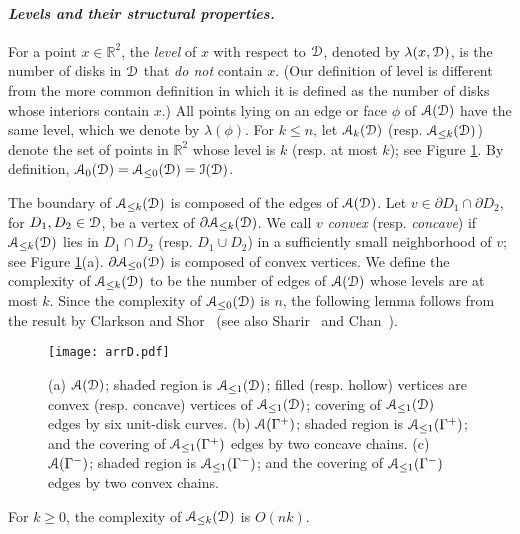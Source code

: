 \documentclass[11pt]{myclass}
\renewcommand{\b}[1]{\ensuremath{\mathbb{#1}}}
\newcommand{\EuD}{\ensuremath{\EuScript{D}}}
\newcommand{\EuA}{\ensuremath{\EuScript{A}}}
\newcommand{\EuI}{\ensuremath{\EuScript{I}}}
\begin{document}
\paragraph{\textbf{\emph{Levels and their structural properties.}}}
For a point $x \in \b{R}^2$, the \emph{level} of $x$ with respect to $\EuD$, denoted by $\lambda(x,\EuD)$, is the number of disks in $\EuD$ that \emph{do not} contain $x$.  (Our definition of level is different from the more common definition in which it is defined as the number of disks whose interiors contain $x$.)  All points lying on an edge or face $\phi$ of $\EuA(\EuD)$ have the same level, which we denote by $\lambda(\phi)$.  For $k \leq n$, let $\EuA_k(\EuD)$ (resp. $\EuA_{\leq k}(\EuD)$) denote the set of points in $\b{R}^2$ whose level is $k$ (resp. at most $k$); see Figure \ref{fig:arrD}.  By definition, $\EuA_0(\EuD) = \EuA_{\leq 0}(\EuD) = \EuI(\EuD)$.  

The boundary of $\EuA_{\leq k}(\EuD)$ is composed of the edges of $\EuA(\EuD)$.  
Let $v \in \partial D_1 \cap \partial D_2$, for $D_1, D_2 \in \EuD$, be a vertex of $\partial \EuA_{\leq k}(\EuD)$.  We call $v$ \emph{convex} (resp. \emph{concave}) if $\EuA_{\leq k}(\EuD)$ lies in $D_1 \cap D_2$ (resp. $D_1 \cup D_2$) in a sufficiently small neighborhood of $v$; see Figure \ref{fig:arrD}(a).  $\partial \EuA_{\leq 0}(\EuD)$ is composed of convex vertices.
We define the complexity of $\EuA_{\leq k}(\EuD)$ to be the number of edges of $\EuA(\EuD)$ whose levels are at most $k$.  Since the complexity of $\EuA_{\leq 0}(\EuD)$ is $n$, the following lemma follows from the result by Clarkson and Shor~\cite{CS89} (see also Sharir~\cite{Sha91} and Chan~\cite{Cha07}).  

\begin{figure}
  \centering
  \texttt{[image: arrD.pdf]}
\caption{\label{fig:arrD} 
\small (a) $\EuA(\EuD)$; shaded region is $\EuA_{\leq 1}(\EuD)$; filled (resp. hollow) vertices are convex (resp. concave) vertices of $\EuA_{\leq 1}(\EuD)$; covering of $\EuA_{\leq 1}(\EuD)$ edges by six unit-disk curves.  
(b) $\EuA(\Gamma^+)$; shaded region is $\EuA_{\leq 1}(\Gamma^+)$; and the covering of $\EuA_{\leq 1}(\Gamma^+)$ edges by two concave chains.
(c) $\EuA(\Gamma^-)$; shaded region is $\EuA_{\leq 1}(\Gamma^-)$; and the covering of $\EuA_{\leq 1}(\Gamma^-)$ edges by two convex chains.}
\end{figure}

\begin{lemma} \emph{\cite{CS89}} For $k \geq 0$, the complexity of $\EuA_{\leq k}(\EuD)$ is $O(nk)$.  
\label{lem:CS-nk}
\end{lemma}
\end{document}
